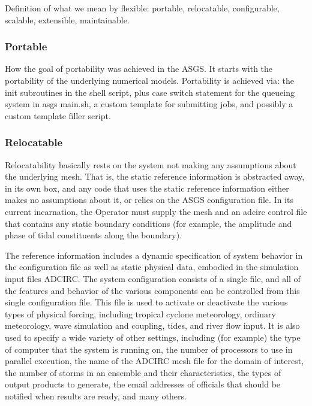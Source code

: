 \documentclass[12pt]{article}
\begin{document}
Definition of what we mean by flexible: portable, relocatable, 
configurable, scalable, extensible, maintainable.

\subsubsection{Portable}

How the goal of portability was achieved in the ASGS. It starts with 
the portability of the underlying numerical models. Portability is achieved
via: the init subroutines in the shell script, plus case switch statement for
the queueing system in asgs main.sh, a custom template for submitting 
jobs, and possibly a custom template filler script. 

\subsubsection{Relocatable}

Relocatability basically rests on the system not making any 
assumptions about the underlying mesh. That is, the static reference 
information is abstracted away, in its own box, and any code that 
uses the static reference information either makes no assumptions 
about it, or relies on the ASGS configuration file. In its current 
incarnation, the Operator must supply the mesh and an adcirc control 
file that contains any static boundary conditions (for example, the 
amplitude and phase of tidal constituents along the boundary). 

The reference information includes a dynamic specification of system 
behavior in the configuration file as well as static physical data, 
embodied in the simulation input files ADCIRC. The system 
configuration consists of a single file, and all of the features and 
behavior of the various components can be controlled from this 
single configuration file. This file is used to activate or 
deactivate the various types of physical forcing, including tropical 
cyclone meteorology, ordinary meteorology, wave simulation and 
coupling, tides, and river flow input. It is also used to specify a 
wide variety of other settings, including (for example) the type of 
computer that the system is running on, the number of processors to 
use in parallel execution, the name of the ADCIRC mesh file for the 
domain of interest, the number of storms in an ensemble and their 
characteristics, the types of output products to generate, the email 
addresses of officials that should be notified when results are 
ready, and many others. 
\end{document}
